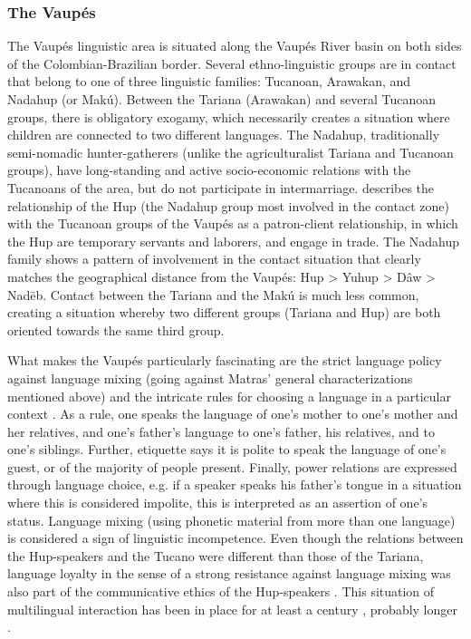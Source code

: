 \documentclass[output=paper,
modfonts
]{langscibook}
\begin{document}
\subsubsection*{The Vaupés}

\noindent The Vaupés linguistic area \parencite[e.g.][]{Aikhenvald2002Language, Aikhenvald2003Multilingualism, Epps2007Vaupes} is situated along the Vaupés River basin on both sides of the Colombian-Brazilian border. Several ethno-linguistic groups are in contact that belong to one of three linguistic families: Tucanoan, Arawakan, and Nadahup (or Makú). Between the Tariana (Arawakan) and several Tucanoan groups, there is obligatory exogamy, which necessarily creates a situation where children are connected to two different languages. The Nadahup, traditionally semi-nomadic hunter-gatherers (unlike the agriculturalist Tariana and Tucanoan groups), have long-standing and active socio-economic relations with the Tucanoans of the area, but do not participate in intermarriage. \textcite[268]{Epps2007Vaupes} describes the relationship of the Hup (the Nadahup group most involved in the contact zone) with the Tucanoan groups of the Vaupés as a patron-client relationship, in which the Hup are temporary servants and laborers, and engage in trade. The Nadahup family shows a pattern of involvement in the contact situation that clearly matches the geographical distance from the Vaupés: Hup > Yuhup > Dâw > Nadëb. Contact between the Tariana and the Makú is much less common, creating a situation whereby two different groups (Tariana and Hup) are both oriented towards the same third group.

What makes the Vaupés particularly fascinating are the strict language policy against language mixing (going against Matras' general characterizations mentioned above) and the intricate rules for choosing a language in a particular context \parencite{Aikhenvald2003Multilingualism}. As a rule, one speaks the language of one's mother to one's mother and her relatives, and one's father's language to one's father, his relatives, and to one's siblings. Further, etiquette says it is polite to speak the language of one's guest, or of the majority of people present. Finally, power relations are expressed through language choice, e.g. if a speaker speaks his father's tongue in a situation where this is considered impolite, this is interpreted as an assertion of one's status. Language mixing (using phonetic material from more than one language) is considered a sign of linguistic incompetence. Even though the relations between the Hup-speakers and the Tucano were different than those of the Tariana, language loyalty in the sense of a strong resistance against language mixing was also part of the communicative ethics of the Hup-speakers \parencite{Epps2007Vaupes}. This situation of multilingual interaction has been in place for at least a century \parencite{Epps2007Vaupes}, probably longer \parencite[24]{Aikhenvald2002Language}.
\end{document}
